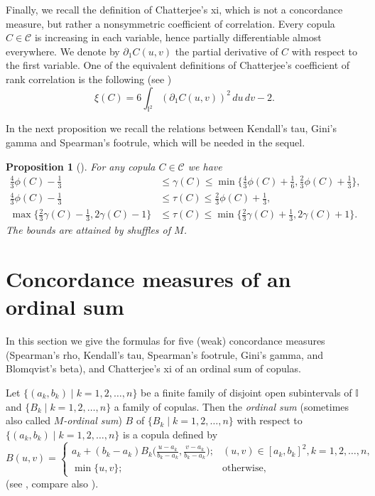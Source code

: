 \documentclass[12pt,a4paper]{amsart}
\newtheorem{proposition}[theorem]{Proposition}
\theoremstyle{definition}
\newcommand{\II}{\mathbb{I}}
\newcommand{\CC}{\mathcal{C}}
\begin{document}
Finally, we recall the definition of Chatterjee's xi, which is not a concordance measure, but rather a nonsymmetric coefficient of correlation.
Every copula $C\in\CC$ is increasing in each variable, hence partially differentiable almost everywhere. We denote by $\partial_1 C(u,v)$ the partial derivative of $C$ with respect to the first variable. One of the equivalent definitions of Chatterjee's coefficient of rank correlation is the following (see \cite{DeSiSt13, Rock25})
\begin{equation} \label{eq:xi}
    \xi(C)= 6 \int_{\II^2} (\partial_1 C(u,v))^2 \, du \, dv -2.
\end{equation}

In the next proposition we recall the relations between Kendall's tau, Gini's gamma and Spearman's footrule, which will be needed in the sequel.


\begin{proposition}[\cite{KoBuMo,KoBuSt}]\label{pro:old-results}
For any copula $C\in\CC$ we have
\begin{align}
    \tfrac43 \phi(C) - \tfrac13 &\leq \gamma(C) \leq \min\big\{\tfrac43 \phi(C)+\tfrac16, \tfrac23 \phi(C)+\tfrac13\big\}, \label{eq:gamma-phi}\\
    \tfrac43\phi(C)-\tfrac13 &\le \tau(C) \le \tfrac23\phi(C)+\tfrac13, \label{eq:tau-phi}\\
    \max\big\{\tfrac23 \gamma(C)-\tfrac13, 2\gamma(C)-1\big\} &\le \tau(C) \le \min\big\{\tfrac23 \gamma(C)+\tfrac13,2\gamma(C)+1\big\}.\label{eq:gamma-tau}
\end{align}
The bounds are attained by shuffles of $M$.
\end{proposition}







\section{Concordance measures of an ordinal sum} \label{sec:ordinal}

In this section we give the formulas for five (weak) concordance measures (Spearman's rho, Kendall's tau, Spearman's footrule, Gini's gamma, and Blomqvist's beta), and Chatterjee's xi of an ordinal sum of copulas.

Let $\{(a_k, b_k) \mid k=1,2, \ldots, n\}$ be a finite family of disjoint open subintervals of $\II$ and $\{B_k \mid k=1,2, \ldots, n\}$ a family of copulas. Then the \emph{ordinal sum} (sometimes also called \emph{$M$-ordinal sum}) $B$ of $\{B_k \mid k=1,2, \ldots, n\}$ with respect to $\{(a_k, b_k) \mid k=1,2, \ldots, n\}$ is a copula defined by 
\begin{equation} \label{eq:ordinal_sum}
B(u, v) = \begin{cases}
		a_k + (b_k-a_k)B_k\big(\frac{u-a_k}{b_k-a_k}, \frac{v-a_k}{b_k-a_k}\big); & (u, v) \in [a_k, b_k]^2, k=1, 2, \dots, n,\\
			\min\{u,v\}; & \text{otherwise},
    \end{cases}
\end{equation}
(see \cite{DuKlSaSe}, compare also \cite[\S3.2.2]{Nels}).
\end{document}
